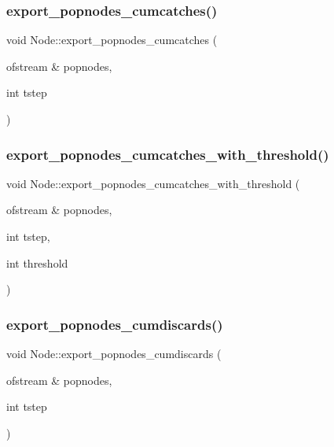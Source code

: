 \subsubsection{\texorpdfstring{export\_popnodes\_cumcatches()}{export\_popnodes\_cumcatches()}}
{\footnotesize\ttfamily void Node\+::export\+\_\+popnodes\+\_\+cumcatches (\begin{DoxyParamCaption}\item[{ofstream \&}]{popnodes,  }\item[{int}]{tstep }\end{DoxyParamCaption})}

\mbox{\label{class_node_a22ff431ad49865e52f83e4c0a6bc1826}} 
\subsubsection{\texorpdfstring{export\_popnodes\_cumcatches\_with\_threshold()}{export\_popnodes\_cumcatches\_with\_threshold()}}
{\footnotesize\ttfamily void Node\+::export\+\_\+popnodes\+\_\+cumcatches\+\_\+with\+\_\+threshold (\begin{DoxyParamCaption}\item[{ofstream \&}]{popnodes,  }\item[{int}]{tstep,  }\item[{int}]{threshold }\end{DoxyParamCaption})}

\mbox{\label{class_node_ae164fea4f1f620f422cfaf25b67ca864}} 
\subsubsection{\texorpdfstring{export\_popnodes\_cumdiscards()}{export\_popnodes\_cumdiscards()}}
{\footnotesize\ttfamily void Node\+::export\+\_\+popnodes\+\_\+cumdiscards (\begin{DoxyParamCaption}\item[{ofstream \&}]{popnodes,  }\item[{int}]{tstep }\end{DoxyParamCaption})}

